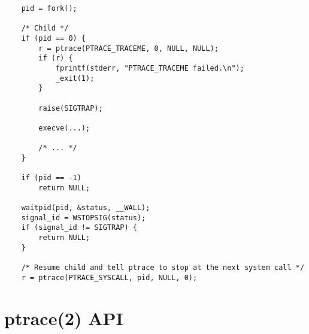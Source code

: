 \documentclass[a4paper, 10pt]{report}
\begin{document}
\begin{lstlisting}
    pid = fork();

    /* Child */
    if (pid == 0) {
        r = ptrace(PTRACE_TRACEME, 0, NULL, NULL);
        if (r) {
            fprintf(stderr, "PTRACE_TRACEME failed.\n");
            _exit(1);
        }

        raise(SIGTRAP);

        execve(...);

        /* ... */
    }

    if (pid == -1)
        return NULL;

    waitpid(pid, &status, __WALL);
    signal_id = WSTOPSIG(status);
    if (signal_id != SIGTRAP) {
        return NULL;
    }

    /* Resume child and tell ptrace to stop at the next system call */
    r = ptrace(PTRACE_SYSCALL, pid, NULL, 0);
\end{lstlisting}

% 
% 
% 
% 
% 
% 

\chapter{ptrace(2) API}
\label{ptrace-api}
\end{document}
